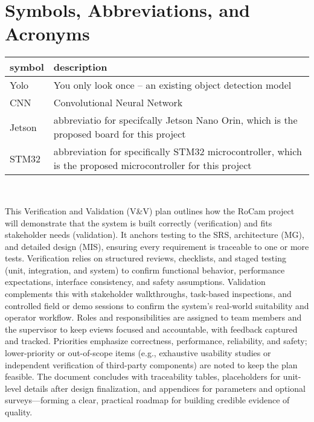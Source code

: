 \documentclass[12pt, titlepage]{article}
\begin{document}
\newpage

\tableofcontents

\section{Symbols, Abbreviations, and Acronyms}

\renewcommand{\arraystretch}{1.2}
\begin{tabular}{l l}
  \toprule
  \textbf{symbol} & \textbf{description}                                              \\
  \midrule
  Yolo            & You only look once -- an existing object detection model          \\
  CNN             & Convolutional Neural Network                                      \\
  Jetson          & abbreviatio for specifcally Jetson Nano Orin, which is the
  proposed board for this project
  \\
  STM32           & abbreviation for specifically STM32 microcontroller, which is the
  proposed microcontroller for this project                                           \\

  \bottomrule
\end{tabular}\\



\newpage


This Verification and Validation (V\&V) plan outlines how the RoCam project
will demonstrate that the system is built correctly (verification) and fits
stakeholder needs (validation). It anchors testing to the SRS, architecture
(MG), and detailed design (MIS), ensuring every requirement is traceable to one
or more tests. Verification relies on structured reviews, checklists, and
staged testing (unit, integration, and system) to confirm functional behavior,
performance expectations, interface consistency, and safety assumptions.
Validation complements this with stakeholder walkthroughs, task-based
inspections, and controlled field or demo sessions to confirm the system’s
real-world suitability and operator workflow. Roles and responsibilities are
assigned to team members and the supervisor to keep eviews focused and
accountable, with feedback captured and tracked. Priorities emphasize
correctness, performance, reliability, and safety; lower-priority or
out-of-scope items (e.g., exhaustive usability studies or independent
verification of third-party components) are noted to keep the plan feasible.
The document concludes with traceability tables, placeholders for unit-level
details after design finalization, and appendices for parameters and optional
surveys—forming a clear, practical roadmap for building credible evidence of
quality.
\end{document}
